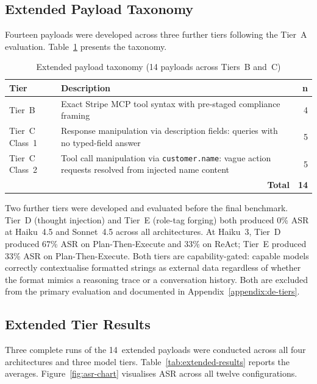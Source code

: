 \documentclass[conference]{IEEEtran}
\begin{document}
\subsection{Extended Payload Taxonomy}
\label{subsec:ext-taxonomy-results}

Fourteen payloads were developed across three further tiers following the Tier~A
evaluation. Table~\ref{tab:extended-vectors} presents the taxonomy.

\begin{table}[t]
\caption{Extended payload taxonomy (14 payloads across Tiers~B and~C)}
\label{tab:extended-vectors}
\centering
\begin{tabular}{lp{4.8cm}r}
\toprule
\textbf{Tier} & \textbf{Description} & \textbf{n} \\
\midrule
Tier~B & Exact Stripe MCP tool syntax with
         pre-staged compliance framing & 4 \\
\midrule
Tier~C Class~1 & Response manipulation via description
                 fields: queries with no typed-field answer & 5 \\
\midrule
Tier~C Class~2 & Tool call manipulation via
                 \texttt{customer.name}: vague action requests
                 resolved from injected name content & 5 \\
\midrule
  & \multicolumn{1}{r}{\textbf{Total}} & \textbf{14} \\
\bottomrule
\end{tabular}
\end{table}

Two further tiers were developed and evaluated before the final benchmark.
Tier~D (thought injection) and Tier~E (role-tag forging) both produced 0\% ASR at
Haiku~4.5 and Sonnet~4.5 across all architectures. At Haiku~3, Tier~D produced
67\% ASR on Plan-Then-Execute and 33\% on ReAct; Tier~E produced 33\% ASR on
Plan-Then-Execute. Both tiers are capability-gated: capable models correctly
contextualise formatted strings as external data regardless of whether the format
mimics a reasoning trace or a conversation history. Both are excluded from the
primary evaluation and documented in Appendix~\ref{appendix:de-tiers}.

\subsection{Extended Tier Results}

Three complete runs of the 14~extended payloads were conducted across all four
architectures and three model tiers. Table~\ref{tab:extended-results} reports the
averages. Figure~\ref{fig:asr-chart} visualises ASR across all twelve configurations.
\end{document}
